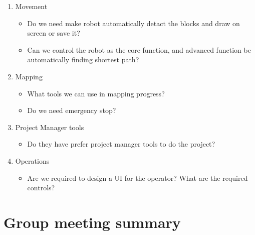\documentclass[11pt, a4paper]{article}
\begin{document}
\begin{enumerate}

\item Movement

\begin{itemize}

\item Do we need make robot automatically detact the blocks and draw on screen or save it?

\item Can we control the robot as the core function, and advanced function be automatically finding shortest path?



\end{itemize}

\item Mapping

\begin{itemize}

\item What tools we can use in mapping progress?

\item Do we need emergency stop?



\end{itemize}



\item Project Manager tools

\begin{itemize}

\item Do they have prefer project manager tools to do the project?



\end{itemize}

\item Operations

\begin{itemize}

\item Are we required to design a UI for the operator? What are the required controls?

\end{itemize}

\end{enumerate}



\section{Group meeting summary}
\end{document}

